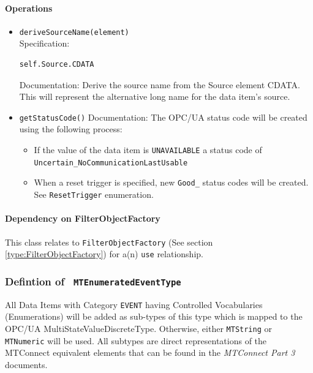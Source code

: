\paragraph{Operations}
\begin{itemize}
  \item \texttt{deriveSourceName(element)}\\
    Specification:
   \indent \begin{lstlisting}
self.Source.CDATA
\end{lstlisting}

    Documentation: Derive the source name from the Source element CDATA. This will represent the alternative long name for the data item's source.

  \item \texttt{getStatusCode()}
    Documentation: The OPC/UA status code will be created using the following process:

\begin{itemize}
  \item If the value of the data item is \texttt{UNAVAILABLE} a status code of \texttt{Uncertain_NoCommunicationLastUsable}
  \item When a reset trigger is specified, new \texttt{Good_} status codes will be created. See \texttt{ResetTrigger} enumeration.
\end{itemize}

\end{itemize}
\paragraph{Dependency on FilterObjectFactory}

This class relates to \texttt{FilterObjectFactory} (See section \ref{type:FilterObjectFactory}) for a(n) \texttt{use} relationship.

\FloatBarrier
\subsubsection{Defintion of \texttt{ MTEnumeratedEventType}} \label{type:MTEnumeratedEventType}

\FloatBarrier

All Data Items with Category \texttt{EVENT} having Controlled Vocabularies (Enumerations) 
will be added as sub-types of this type which is mapped to the OPC/UA MultiStateValueDiscreteType. 
Otherwise, either \texttt{MTString} or \texttt{MTNumeric} will be used. All subtypes are direct representations of the 
MTConnect equivalent elements that can be found in the \textit{MTConnect Part 3} documents.

